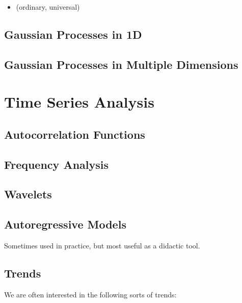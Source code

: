 \documentclass[
  letterpaper,
  DIV=11,
  numbers=noendperiod]{scrreprt}
\providecommand{\tightlist}{%
  \setlength{\itemsep}{0pt}\setlength{\parskip}{0pt}}
\begin{document}
\begin{itemize}
\tightlist
\item
  (ordinary, universal)
\end{itemize}

\subsection{Gaussian Processes in 1D}\label{gaussian-processes-in-1d}

\subsection{Gaussian Processes in Multiple
Dimensions}\label{gaussian-processes-in-multiple-dimensions}

\section{Time Series Analysis}\label{time-series-analysis}

\subsection{Autocorrelation Functions}\label{autocorrelation-functions}

\subsection{Frequency Analysis}\label{frequency-analysis}

\subsection{Wavelets}\label{wavelets}

\subsection{Autoregressive Models}\label{autoregressive-models}

Sometimes used in practice, but most useful as a didactic tool.

\subsection{Trends}\label{trends}

We are often interested in the following sorts of trends:
\end{document}
